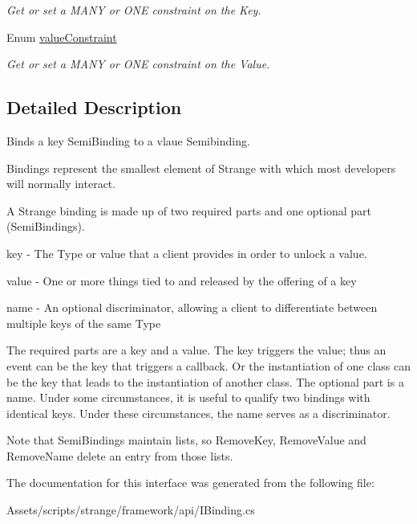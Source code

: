 \begin{DoxyCompactItemize}
\begin{DoxyCompactList}\small\item\em Get or set a M\-A\-N\-Y or O\-N\-E constraint on the Key. \end{DoxyCompactList}\item 
\hypertarget{interfacestrange_1_1framework_1_1api_1_1_i_binding_a83c99f79ce6adda2811ff2e9c4fb2ff2}{Enum \hyperlink{interfacestrange_1_1framework_1_1api_1_1_i_binding_a83c99f79ce6adda2811ff2e9c4fb2ff2}{value\-Constraint}}\label{interfacestrange_1_1framework_1_1api_1_1_i_binding_a83c99f79ce6adda2811ff2e9c4fb2ff2}

\begin{DoxyCompactList}\small\item\em Get or set a M\-A\-N\-Y or O\-N\-E constraint on the Value. \end{DoxyCompactList}\end{DoxyCompactItemize}


\subsection{Detailed Description}
Binds a key Semi\-Binding to a vlaue Semibinding. 

Bindings represent the smallest element of Strange with which most developers will normally interact.

A Strange binding is made up of two required parts and one optional part (Semi\-Bindings). 
\begin{DoxyItemize}
\item key -\/ The Type or value that a client provides in order to unlock a value. 
\item value -\/ One or more things tied to and released by the offering of a key 
\item name -\/ An optional discriminator, allowing a client to differentiate between multiple keys of the same Type 
\end{DoxyItemize}

The required parts are a key and a value. The key triggers the value; thus an event can be the key that triggers a callback. Or the instantiation of one class can be the key that leads to the instantiation of another class. The optional part is a name. Under some circumstances, it is useful to qualify two bindings with identical keys. Under these circumstances, the name serves as a discriminator. \par
 \par
 Note that Semi\-Bindings maintain lists, so Remove\-Key, Remove\-Value and Remove\-Name delete an entry from those lists. 

The documentation for this interface was generated from the following file\-:\begin{DoxyCompactItemize}
\item 
Assets/scripts/strange/framework/api/I\-Binding.\-cs\end{DoxyCompactItemize}
